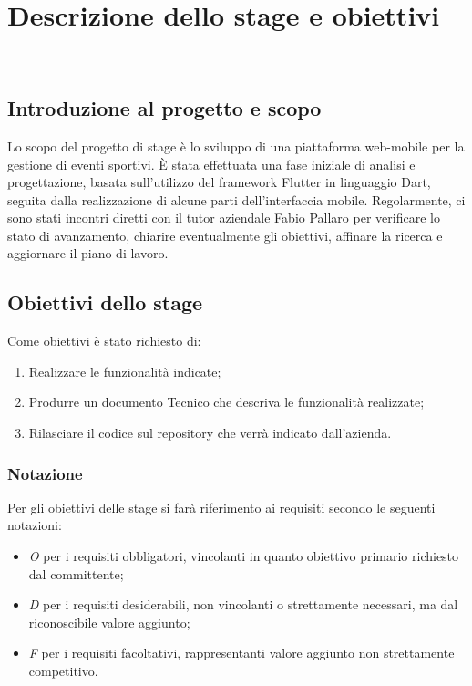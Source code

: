 
\chapter{Descrizione dello stage e obiettivi}
\label{cap:Descrizione dello stage e obiettivi}

\\

\section{Introduzione al progetto e scopo}
Lo scopo del progetto di stage è lo sviluppo di una piattaforma web-mobile per la gestione di eventi sportivi. È stata effettuata una fase iniziale di analisi e progettazione, basata sull’utilizzo del framework Flutter in linguaggio Dart, seguita dalla realizzazione di alcune parti dell’interfaccia mobile.
Regolarmente, ci sono stati incontri diretti con il tutor aziendale Fabio Pallaro per verificare lo stato di avanzamento, chiarire eventualmente gli obiettivi, affinare la ricerca e aggiornare il piano di lavoro.

\section{Obiettivi dello stage}
Come obiettivi è stato richiesto di:
\begin{enumerate}
	\item Realizzare le funzionalità indicate;
	\item Produrre un documento Tecnico che descriva le funzionalità realizzate;
	\item Rilasciare il codice sul repository che verrà indicato dall’azienda.\\
	
\end{enumerate}
\subsection*{Notazione}
Per gli obiettivi delle stage si farà riferimento ai requisiti secondo le seguenti notazioni:
\begin{itemize}
	\item \textit{O} per i requisiti obbligatori, vincolanti in quanto obiettivo primario richiesto dal committente;
	\item \textit{D} per i requisiti desiderabili, non vincolanti o strettamente necessari,
	ma dal riconoscibile valore aggiunto;
	\item \textit{F} per i requisiti facoltativi, rappresentanti valore aggiunto non strettamente 
	competitivo.
\end{itemize}

